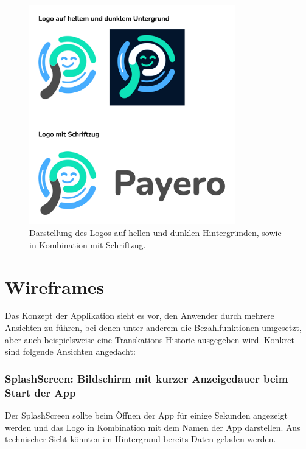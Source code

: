 \begin{figure}[H]
  \centering
  \includegraphics[width=0.8\textwidth]{images/branding.png}
  \caption{Darstellung des Logos auf hellen und dunklen Hintergründen, sowie in Kombination mit Schriftzug.}
  \label{branding}
\end{figure}

  \section{Wireframes}

  Das Konzept der Applikation sieht es vor, den Anwender durch mehrere Ansichten zu führen, bei denen unter anderem die Bezahlfunktionen umgesetzt, aber auch beispielsweise eine Transkations-Historie ausgegeben wird.
  Konkret sind folgende Ansichten angedacht:

  \subsubsection*{SplashScreen: Bildschirm mit kurzer Anzeigedauer beim Start der App}
  Der SplashScreen sollte beim Öffnen der App für einige Sekunden angezeigt werden und das Logo in Kombination mit dem Namen der App darstellen.
  Aus technischer Sicht könnten im Hintergrund bereits Daten geladen werden.
